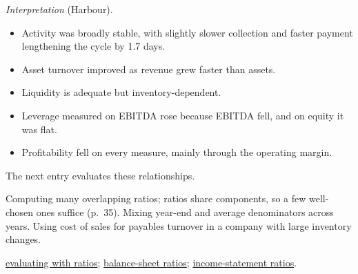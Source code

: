 \begin{qfmethod}
 \emph{Interpretation} (Harbour).
\begin{itemize}
\item Activity was broadly stable, with slightly slower collection and faster payment lengthening the cycle by 1.7 days.
\item Asset turnover improved as revenue grew faster than assets.
\item Liquidity is adequate but inventory-dependent.
\item Leverage measured on EBITDA rose because EBITDA fell, and on equity it was flat.
\item Profitability fell on every measure, mainly through the operating margin.
\end{itemize}
The next entry evaluates these relationships.

 Computing many overlapping ratios; ratios share components, so a few well-chosen ones suffice (p.~35). Mixing year-end and average denominators across years. Using cost of sales for payables turnover in a company with large inventory changes.

 \hyperref[meth:ratio-based-evaluation]{evaluating with ratios}; \hyperref[meth:balance-sheet-ratios]{balance-sheet ratios}; \hyperref[meth:income-statement-ratios]{income-statement ratios}.

\end{qfmethod}

